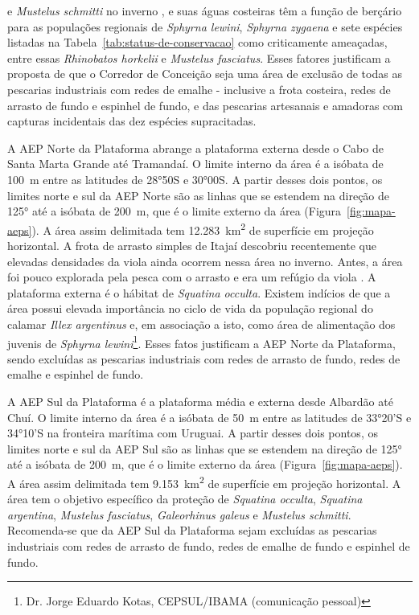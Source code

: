 \documentclass[a4paper,11pt,twoside,showtrims,onecolumn,openright,final]{memoir}
\begin{document}
e \emph{Mustelus schmitti} no inverno \citep{PERES1991,vooren1997}, %
e suas águas costeiras têm a função de berçário para as populações regionais de \emph{Sphyrna lewini}, 
\emph{Sphyrna zygaena} e sete espécies listadas na Tabela~\ref{tab:status-de-conservacao} 
como criticamente ameaçadas, entre essas \emph{Rhinobatos horkelii} e \emph{Mustelus fasciatus}. 
Esses fatores justificam a proposta de que o Corredor de Conceição seja uma área de exclusão de todas as 
pescarias industriais com redes de emalhe - inclusive a frota costeira, redes de arrasto de fundo 
e espinhel de fundo, e das pescarias artesanais 
e amadoras com capturas incidentais das dez espécies supracitadas. 

A AEP Norte da Plataforma abrange a plataforma externa desde o Cabo de Santa Marta Grande 
até Tramandaí. O limite interno da área é a isóbata de 100~m entre as latitudes de 28°50S e 30°00S.
A partir desses dois pontos, os limites norte e sul da AEP Norte são as linhas que se estendem na 
direção de 125° até a isóbata de 200~m, que é o limite externo da área (Figura~\ref{fig:mapa-aeps}). 
A área assim delimitada tem 12.283~km\textsuperscript{2} de superfície em projeção horizontal. A frota de arrasto 
simples de Itajaí descobriu recentemente que elevadas densidades da viola ainda ocorrem nessa área 
no inverno. Antes, a área foi pouco explorada pela pesca com o arrasto 
e era um refúgio da viola \citep{martins2003}. %
A plataforma externa é o hábitat de \emph{Squatina occulta}. Existem indícios de que a área possui 
elevada importância no ciclo de vida da população regional do calamar \emph{Illex argentinus} e, 
em associação a  isto,  como área de alimentação dos juvenis de \emph{Sphyrna lewini}\footnote{Dr. Jorge Eduardo Kotas, CEPSUL/IBAMA (comunicação pessoal)}.
Esses fatos justificam a AEP Norte da Plataforma, sendo excluídas as pescarias industriais 
com redes de arrasto de fundo,  redes de emalhe e espinhel de fundo. %

A AEP Sul da Plataforma é a plataforma média e externa desde Albardão até Chuí.  
O limite interno da área é a  isóbata de 50~m entre as latitudes de 33°20'S e 34°10'S 
na fronteira marítima com Uruguai. A partir desses dois pontos, os limites norte e sul 
da AEP Sul são as linhas que se estendem na direção de 125° até a isóbata de 200~m, que 
é o limite externo da área (Figura~\ref{fig:mapa-aeps}).  A área assim delimitada tem 9.153~km\textsuperscript{2} 
de superfície em projeção horizontal. A área tem o objetivo específico da proteção 
de \emph{Squatina occulta}, \emph{Squatina argentina}, \emph{Mustelus fasciatus}, \emph{Galeorhinus galeus} e \emph{Mustelus schmitti}. 
Recomenda-se que da AEP Sul da Plataforma sejam excluídas as pescarias industriais 
com redes de arrasto de fundo,  redes de emalhe de fundo e espinhel de fundo. 
\end{document}
